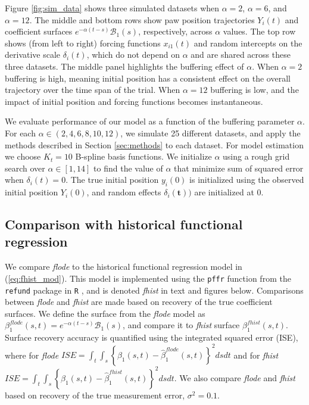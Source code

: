 \documentclass[preprint]{JASA}
\begin{document}
Figure \ref{fig:sim_data} shows three simulated datasets when
\(\alpha = 2\), \(\alpha = 6\), and \(\alpha = 12\). The middle and
bottom rows show paw position trajectories \(Y_i(t)\) and coefficient
surfaces \(e^{-\alpha (t-s)} \mathcal{B}_1(s)\), respectively, across
\(\alpha\) values. The top row shows (from left to right) forcing
functions \(x_{i1}(t)\) and random intercepts on the derivative scale
\(\delta_i(t)\), which do not depend on \(\alpha\) and are shared across
these three datasets. The middle panel highlights the buffering effect
of \(\alpha\). When \(\alpha = 2\) buffering is high, meaning initial
position has a consistent effect on the overall trajectory over the time
span of the trial. When \(\alpha = 12\) buffering is low, and the impact
of initial position and forcing functions becomes instantaneous.

We evaluate performance of our model as a function of the buffering
parameter \(\alpha\). For each \(\alpha \in (2, 4, 6, 8, 10, 12)\), we
simulate 25 different datasets, and apply the methods described in
Section \ref{sec:methods} to each dataset. For model estimation we
choose \(K_t = 10\) B-spline basis functions. We initialize \(\alpha\)
using a rough grid search over \(\alpha \in [1, 14]\) to find the value
of \(\alpha\) that minimize sum of squared error when
\(\delta_i(t) = 0\). The true initial position \(y_i(0)\) is initialized
using the observed initial position \(Y_i(0)\), and random effects
\(\delta_i(\mathbf{t}))\) are initialized at 0.

\hypertarget{comparison-with-historical-functional-regression}{%
\subsection{Comparison with historical functional
regression}\label{comparison-with-historical-functional-regression}}

We compare \emph{flode} to the historical functional regression model in
(\ref{eq:fhist_mod}). This model is implemented using the \texttt{pffr}
function from the \texttt{refund} package in \texttt{R} \citep{refund},
and is denoted \emph{fhist} in text and figures below. Comparisons
between \emph{flode} and \emph{fhist} are made based on recovery of the
true coefficient surfaces. We define the surface from the \emph{flode}
model as \(\beta_1^{flode}(s, t) = e^{-\alpha (t-s)} \mathcal{B}_1(s)\),
and compare it to \emph{fhist} surface \(\beta_1^{fhist}(s, t)\).
Surface recovery accuracy is quantified using the integrated squared
error (ISE), where for \emph{flode}
\(ISE = \int_t \int_s \left\{ \beta_1(s, t) - \widehat{\beta}_1^{flode}(s, t) \right\}^2 ds dt\)
and for \emph{fhist}
\(ISE = \int_t \int_s \left\{ \beta_1(s, t) - \widehat{\beta}_1^{fhist}(s, t) \right\}^2 ds dt\).
We also compare \emph{flode} and \emph{fhist} based on recovery of the
true measurement error, \(\sigma^2 = 0.1\).
\end{document}
